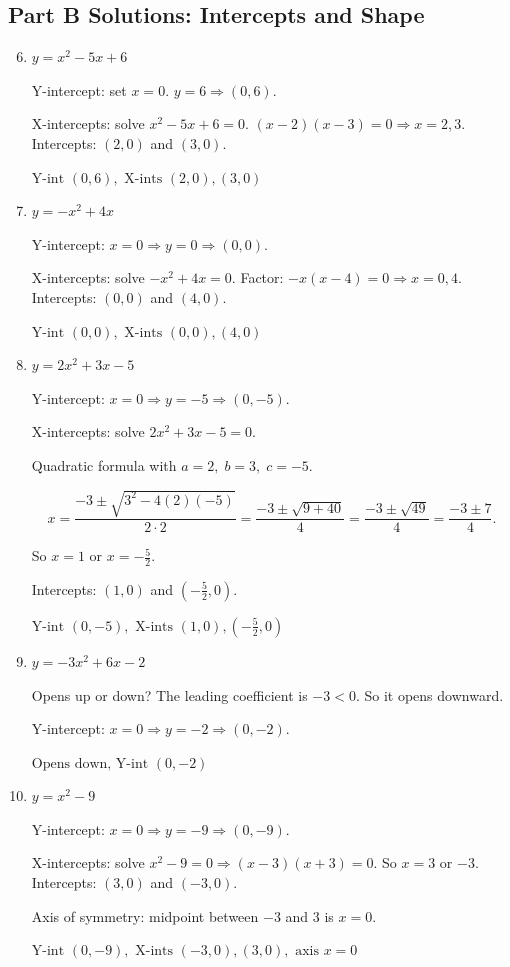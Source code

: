 \documentclass[14pt]{extarticle}
\begin{document}
\subsection*{Part B Solutions: Intercepts and Shape}
\begin{enumerate}
  \setcounter{enumi}{5}
  \item \(y = x^2 - 5x + 6\)

  Y-intercept: set \(x = 0\).  
  \(y = 6 \Rightarrow (0, 6).\)

  X-intercepts: solve \(x^2 - 5x + 6 = 0.\)  
  \((x - 2)(x - 3) = 0 \Rightarrow x = 2, 3.\)  
  Intercepts: \((2, 0)\) and \((3, 0).\)

  \(\boxed{\text{Y-int } (0, 6), \text{ X-ints } (2, 0), (3, 0)}\)

  \item \(y = -x^2 + 4x\)

  Y-intercept: \(x = 0 \Rightarrow y = 0 \Rightarrow (0, 0).\)

  X-intercepts: solve \(-x^2 + 4x = 0.\)  
  Factor: \(-x(x - 4) = 0 \Rightarrow x = 0, 4.\)  
  Intercepts: \((0, 0)\) and \((4, 0).\)

  \(\boxed{\text{Y-int } (0, 0), \text{ X-ints } (0, 0), (4, 0)}\)

  \item \(y = 2x^2 + 3x - 5\)

  Y-intercept: \(x = 0 \Rightarrow y = -5 \Rightarrow (0, -5).\)

  X-intercepts: solve \(2x^2 + 3x - 5 = 0.\)

  Quadratic formula with \(a = 2,\; b = 3,\; c = -5.\)

  \[
  x = \frac{-3 \pm \sqrt{3^2 - 4(2)(-5)}}{2 \cdot 2}
  = \frac{-3 \pm \sqrt{9 + 40}}{4}
  = \frac{-3 \pm \sqrt{49}}{4}
  = \frac{-3 \pm 7}{4}.
  \]

  So \(x = 1\) or \(x = -\tfrac{5}{2}.\)

  Intercepts: \((1, 0)\) and \(\left(-\tfrac{5}{2}, 0\right).\)

  \(\boxed{\text{Y-int } (0, -5), \text{ X-ints } (1, 0), (-\tfrac{5}{2}, 0)}\)

  \item \(y = -3x^2 + 6x - 2\)

  Opens up or down? The leading coefficient is \(-3 < 0.\)  
  So it opens downward.

  Y-intercept: \(x = 0 \Rightarrow y = -2 \Rightarrow (0, -2).\)

  \(\boxed{\text{Opens down, Y-int } (0, -2)}\)

  \item \(y = x^2 - 9\)

  Y-intercept: \(x = 0 \Rightarrow y = -9 \Rightarrow (0, -9).\)

  X-intercepts: solve \(x^2 - 9 = 0 \Rightarrow (x - 3)(x + 3) = 0.\)  
  So \(x = 3\) or \(-3.\)  
  Intercepts: \((3, 0)\) and \((-3, 0).\)

  Axis of symmetry: midpoint between \(-3\) and \(3\) is \(x = 0.\)

  \(\boxed{\text{Y-int } (0, -9), \text{ X-ints } (-3, 0), (3, 0), \text{ axis } x = 0}\)
\end{enumerate}
\end{document}

